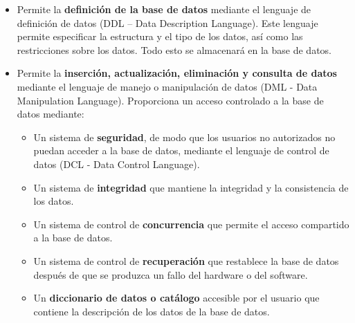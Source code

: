 \begin{itemize}
	\item Permite la \textbf{definición de la base de datos} mediante el lenguaje de definición de datos (DDL – Data Description Language). Este lenguaje permite especificar la estructura y el tipo de los datos, así como las restricciones sobre los datos. Todo esto se almacenará en la base de datos.
	
	\item Permite la \textbf{inserción, actualización, eliminación y consulta de datos} mediante el lenguaje de manejo o manipulación de datos (DML - Data Manipulation Language). Proporciona un acceso controlado a la base de datos mediante:
	\begin{itemize}
        \item Un sistema de \textbf{seguridad}, de modo que los usuarios no autorizados no puedan acceder a la base de datos, mediante el lenguaje de control de datos (DCL - Data Control Language).
        
        \item Un sistema de \textbf{integridad} que mantiene la integridad y la consistencia de los datos.
        
        \item Un sistema de control de \textbf{concurrencia} que permite el acceso compartido a la base de datos.
        
        \item Un sistema de control de \textbf{recuperación} que restablece la base de datos después de que se produzca un fallo del hardware o del software.
        
        \item Un \textbf{diccionario de datos o catálogo} accesible por el usuario que contiene la descripción de los datos de la base de datos.
	\end{itemize}
\end{itemize}

\newpage